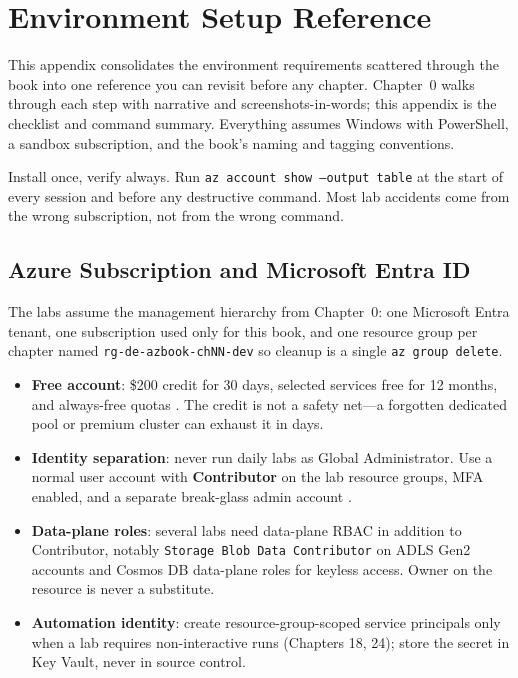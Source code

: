 \chapter{Environment Setup Reference}
%
This appendix consolidates the environment requirements scattered through the book into one
reference you can revisit before any chapter. Chapter~0 walks through each step with narrative
and screenshots-in-words; this appendix is the checklist and command summary. Everything assumes
Windows with PowerShell, a sandbox subscription, and the book's naming and tagging conventions.

\begin{notebox}
Install once, verify always. Run \texttt{az account show --output table} at the start of every
session and before any destructive command. Most lab accidents come from the wrong subscription,
not from the wrong command.
\end{notebox}

\section{Azure Subscription and Microsoft Entra ID}
%
The labs assume the management hierarchy from Chapter~0: one Microsoft Entra tenant, one
subscription used only for this book, and one resource group per chapter named
\texttt{rg-de-azbook-chNN-dev} so cleanup is a single \texttt{az group delete}.

\begin{itemize}
    \item \textbf{Free account}: \$200 credit for 30 days, selected services free for 12 months,
    and always-free quotas \cite{microsoft2025azureFreeAccount}. The credit is not a safety
    net---a forgotten dedicated pool or premium cluster can exhaust it in days.
    \item \textbf{Identity separation}: never run daily labs as Global Administrator. Use a normal
    user account with \textbf{Contributor} on the lab resource groups, MFA enabled, and a separate
    break-glass admin account \cite{microsoft2025entra,microsoft2025rbac}.
    \item \textbf{Data-plane roles}: several labs need data-plane RBAC in addition to Contributor,
    notably \texttt{Storage Blob Data Contributor} on ADLS Gen2 accounts and Cosmos DB data-plane
    roles for keyless access. Owner on the resource is never a substitute.
    \item \textbf{Automation identity}: create resource-group-scoped service principals only when a
    lab requires non-interactive runs (Chapters 18, 24); store the secret in Key Vault, never in
    source control.
\end{itemize}

